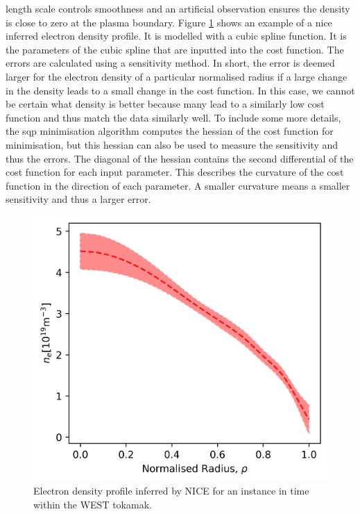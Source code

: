 length scale controls smoothness and an artificial observation ensures the density is close to zero at the plasma boundary. Figure \ref{fig:nice_example} shows an example of a \gls{nice} inferred electron density profile. It is modelled with a cubic spline function. It is the parameters of the cubic spline that are inputted into the cost function. The errors are calculated using a sensitivity method. In short, the error is deemed larger for the electron density of a particular normalised radius if a large change in the density leads to a small change in the cost function. In this case, we cannot be certain what density is better because many lead to a similarly low cost function and thus match the data similarly well. To include some more details, the \gls{sqp} minimisation algorithm computes the hessian of the cost function for minimisation, but this hessian can also be used to measure the sensitivity and thus the errors. The diagonal of the hessian contains the second differential of the cost function for each input parameter. This describes the curvature of the cost function in the direction of each parameter. A smaller curvature means a smaller sensitivity and thus a larger error.

\begin{figure}
  \centering
  \includegraphics[width=13cm]{images/niceExample.png}
  \caption{Electron density profile inferred by NICE for an instance in time within the WEST tokamak.}
  \label{fig:nice_example}
\end{figure}

